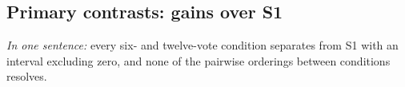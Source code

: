 \begin{table}[tbp]
\centering
\footnotesize
\caption{Expansion set (119 fresh questions, 16-call matrix). Accuracy (\%) of the fixed conditions, the unanimity rate, and the two rule replays. $\S$: Qwen3.7-Flash completed 60 of 119 questions on a subset that under-represents SAT-Math and GSM8K (Section~\ref{sec:heldout}); its row is a partial replication, not a full one. Pooled aggregates the four fully covered models over 476 model--question pairs (questions weighted equally, each question contributing the mean over its four models).}
\label{tab:expand}

\end{table}

\subsection{Primary contrasts: gains over S1}
\label{sec:heldoutprimary}

\emph{In one sentence:} every six- and twelve-vote condition separates from S1 with an interval excluding zero, and none of the pairwise orderings between conditions resolves.

